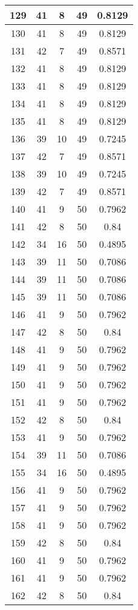 \documentclass[letterpaper, 12pt]{article}
\begin{document}
\begin{longtable}{|c|c|c|c|c|}
\hline
129 & 41 & 8 & 49 & 0.8129 \\
\hline
130 & 41 & 8 & 49 & 0.8129 \\
\hline
131 & 42 & 7 & 49 & 0.8571 \\
\hline
132 & 41 & 8 & 49 & 0.8129 \\
\hline
133 & 41 & 8 & 49 & 0.8129 \\
\hline
134 & 41 & 8 & 49 & 0.8129 \\
\hline
135 & 41 & 8 & 49 & 0.8129 \\
\hline
136 & 39 & 10 & 49 & 0.7245 \\
\hline
137 & 42 & 7 & 49 & 0.8571 \\
\hline
138 & 39 & 10 & 49 & 0.7245 \\
\hline
139 & 42 & 7 & 49 & 0.8571 \\
\hline
140 & 41 & 9 & 50 & 0.7962 \\
\hline
141 & 42 & 8 & 50 & 0.84 \\
\hline
142 & 34 & 16 & 50 & 0.4895 \\
\hline
143 & 39 & 11 & 50 & 0.7086 \\
\hline
144 & 39 & 11 & 50 & 0.7086 \\
\hline
145 & 39 & 11 & 50 & 0.7086 \\
\hline
146 & 41 & 9 & 50 & 0.7962 \\
\hline
147 & 42 & 8 & 50 & 0.84 \\
\hline
148 & 41 & 9 & 50 & 0.7962 \\
\hline
149 & 41 & 9 & 50 & 0.7962 \\
\hline
150 & 41 & 9 & 50 & 0.7962 \\
\hline
151 & 41 & 9 & 50 & 0.7962 \\
\hline
152 & 42 & 8 & 50 & 0.84 \\
\hline
153 & 41 & 9 & 50 & 0.7962 \\
\hline
154 & 39 & 11 & 50 & 0.7086 \\
\hline
155 & 34 & 16 & 50 & 0.4895 \\
\hline
156 & 41 & 9 & 50 & 0.7962 \\
\hline
157 & 41 & 9 & 50 & 0.7962 \\
\hline
158 & 41 & 9 & 50 & 0.7962 \\
\hline
159 & 42 & 8 & 50 & 0.84 \\
\hline
160 & 41 & 9 & 50 & 0.7962 \\
\hline
161 & 41 & 9 & 50 & 0.7962 \\
\hline
162 & 42 & 8 & 50 & 0.84 \\

\end{longtable}
\end{document}
